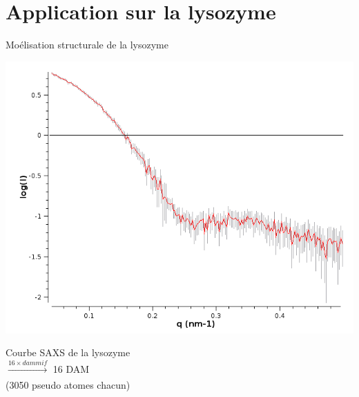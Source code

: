 \documentclass{beamer}
\begin{document}
\section{Application sur la lysozyme}

\begin{frame}{Mo\'elisation structurale de la lysozyme}

\begin{minipage}{0.40\linewidth}
    \begin{flushleft}
    \includegraphics[scale=0.2]{saxscurve.png}
    \end{flushleft}
\end{minipage} \hfill
\begin{minipage}{0.55\linewidth}
  Courbe SAXS de la lysozyme\\ 
  $\xrightarrow[]{16 \times dammif}$ 16 DAM\\
  (3050 pseudo atomes chacun)
\end{minipage}




\end{frame}
\end{document}
